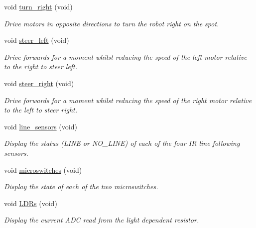 \begin{DoxyCompactItemize}
void \hyperlink{classIDP_1_1SelfTests_a4e4b66ddff2de3444f1e9383dcf463a6}{turn\_\-right} (void)
\begin{DoxyCompactList}\small\item\em Drive motors in opposite directions to turn the robot right on the spot. \item\end{DoxyCompactList}\item 
void \hyperlink{classIDP_1_1SelfTests_ae54bd0e6c01c5d1d794363cc676dbb92}{steer\_\-left} (void)
\begin{DoxyCompactList}\small\item\em Drive forwards for a moment whilst reducing the speed of the left motor relative to the right to steer left. \item\end{DoxyCompactList}\item 
void \hyperlink{classIDP_1_1SelfTests_a7f9c5999de2e7c4f59c8c5a60965e876}{steer\_\-right} (void)
\begin{DoxyCompactList}\small\item\em Drive forwards for a moment whilst reducing the speed of the right motor relative to the left to steer right. \item\end{DoxyCompactList}\item 
void \hyperlink{classIDP_1_1SelfTests_aa73ad4de6c1d2b725ed796c10f54ab7c}{line\_\-sensors} (void)
\begin{DoxyCompactList}\small\item\em Display the status (LINE or NO\_\-LINE) of each of the four IR line following sensors. \item\end{DoxyCompactList}\item 
void \hyperlink{classIDP_1_1SelfTests_a6b2e4d0517de4b73c63f1b1a475b602f}{microswitches} (void)
\begin{DoxyCompactList}\small\item\em Display the state of each of the two microswitches. \item\end{DoxyCompactList}\item 
void \hyperlink{classIDP_1_1SelfTests_a56952650637691f869ef21f7d43f1226}{LDRs} (void)
\begin{DoxyCompactList}\small\item\em Display the current ADC read from the light dependent resistor. \item\end{DoxyCompactList}\item 

\end{DoxyCompactItemize}
